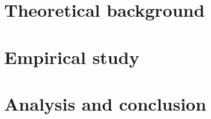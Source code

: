 \documentclass[output=book,
]{langscibook}
\begin{document}
	\maketitle
	\frontmatter
	{\sloppy\tableofcontents}
%	
% 	
	
	\mainmatter
	
	


\part{Theoretical background}



\part{Empirical study}




\part{Analysis and conclusion}


	
	
%	
	
\end{document}
